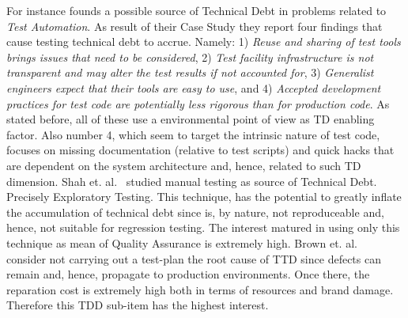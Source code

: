 For instance \cite{test_automation_td} founds a possible source of Technical Debt in problems related to \textit{Test Automation}. As result of their Case Study they report four findings that cause testing technical debt to accrue. Namely: 1) \textit{Reuse and sharing of test tools brings issues that need to be considered}, 2) \textit{Test facility infrastructure is not transparent and may alter the test results if not accounted for}, 3) \textit{Generalist engineers expect that their tools are easy to use}, and 4) \textit{Accepted development practices for test code are potentially less rigorous than for production code}. As stated before, all of these use a environmental point of view as TD enabling factor. Also number 4, which seem to target the intrinsic nature of test code, focuses on missing documentation (relative to test scripts) and quick hacks that are dependent on the system architecture and, hence, related to such TD dimension. Shah et. al.\ \cite{exploratorying_testing_td} studied manual testing as source of Technical Debt. Precisely Exploratory Testing. This technique, has the potential to greatly inflate the accumulation of technical debt since is, by nature, not reproduceable and, hence, not suitable for regression testing. The interest matured in using only this technique as mean of Quality Assurance is extremely high. Brown et. al.\ \cite{td_current_vs_optimal_quality} consider not carrying out a test-plan the root cause of TTD since defects can remain and, hence, propagate to production environments. Once there, the reparation cost is extremely high both in terms of resources and brand damage. Therefore this TDD sub-item has the highest interest.

